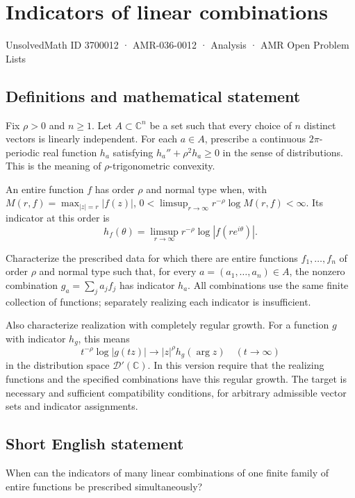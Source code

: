 \documentclass[11pt,a4paper]{article}
\begin{document}
\section*{Indicators of linear combinations}\label{3700012}
{\small UnsolvedMath ID 3700012 · AMR-036-0012 · Analysis · AMR Open Problem Lists}
\subsection{Definitions and mathematical statement}
Fix $\rho>0$ and $n\geq1$. Let $A\subset\mathbb C^n$ be
a set such that every choice of $n$ distinct vectors is
linearly independent. For each $a\in A$, prescribe a
continuous $2\pi$-periodic real function $h_a$ satisfying
$h_a''+\rho^2h_a\geq0$ in the sense of distributions.
This is the meaning of $\rho$-trigonometric convexity.

An entire function $f$ has order $\rho$ and normal type
when, with $M(r,f)=\max_{|z|=r}|f(z)|$,
$0<\limsup_{r\to\infty}r^{-\rho}\log M(r,f)<\infty$.
Its indicator at this order is
\[
 h_f(\theta)=\limsup_{r\to\infty}
                 r^{-\rho}\log|f(re^{i\theta})|.
\]

Characterize the prescribed data for which there are entire
functions $f_1,\ldots,f_n$ of order $\rho$ and normal type
such that, for every $a=(a_1,\ldots,a_n)\in A$, the
nonzero combination $g_a=\sum_ja_jf_j$ has indicator $h_a$.
All combinations use the same finite collection of functions;
separately realizing each indicator is insufficient.

Also characterize realization with completely regular growth.
For a function $g$ with indicator $h_g$, this means
\[
 t^{-\rho}\log|g(tz)|\longrightarrow
             |z|^\rho h_g(\arg z)\quad(t\to\infty)
\]
in the distribution space $\mathcal D'(\mathbb C)$.
In this version require that the realizing functions and
the specified combinations have this regular growth.
The target is necessary and sufficient compatibility
conditions, for arbitrary admissible vector sets and
indicator assignments.
\subsection{Short English statement}
When can the indicators of many linear combinations of one finite family of entire functions be prescribed simultaneously?
\end{document}
